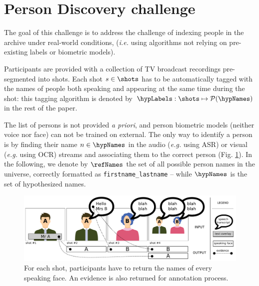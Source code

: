 \section{Person Discovery challenge}
\label{sec:challenge}


The goal of this challenge is to address the challenge of indexing people in the archive under real-world conditions,  (\emph{i.e.} using algorithms not relying on pre-existing labels or biometric models).

 Participants are provided with a collection of TV broadcast recordings pre-segmented into shots.
Each shot $s \in \shots$ has to be automatically tagged with the names of people both speaking and appearing at the same time during the shot: this tagging algorithm is denoted by $\hypLabels : \shots \mapsto \mathcal{P}(\hypNames)$ in the rest of the paper.

The list of persons is not provided \emph{a priori}, and person biometric models (neither voice nor face) can not be trained on external. The only way to identify a person is by finding their name $n \in \hypNames$ in the audio (\emph{e.g.} using ASR) or visual (\emph{e.g.} using OCR) streams and associating them to the correct person (Fig. \ref{fig:evidence}). %
In the following, we denote by $\refNames$ the set of all possible person names in the universe, correctly formatted as \texttt{firstname\_lastname} -- while $\hypNames$ is the set of hypothesized names.

\begin{figure}[tb]
 \centering
 \includegraphics[width=1.\linewidth]{evidence.pdf}
\vspace*{-5mm}
 \caption{For each shot, participants have to return the names of every speaking face. An evidence is also returned for annotation process.}
\vspace*{-3mm}
 \label{fig:evidence}
\end{figure}

